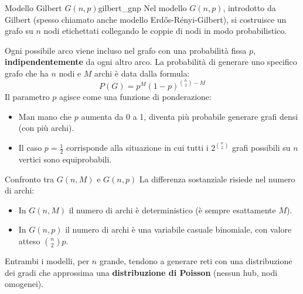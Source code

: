 \begin{definizione}{Modello Gilbert $G(n, p)$}{gilbert_gnp}
    Nel modello \textbf{$G(n, p)$}, introdotto da Gilbert (spesso chiamato
    anche modello Erd\H{o}s-Rényi-Gilbert), si costruisce un grafo su $n$ nodi
    etichettati collegando le coppie di nodi in modo probabilistico.
    
    Ogni possibile arco viene incluso nel grafo con una probabilità fissa $p$,
    \textbf{indipendentemente} da ogni altro arco.
    La probabilità di generare uno specifico grafo che ha $n$ nodi e $M$
    archi è data dalla formula:
    \[
        P(G) = p^M (1-p)^{\binom{n}{2} - M}
    \]
    Il parametro $p$ agisce come una funzione di ponderazione:
    \begin{itemize}
        \item Man mano che $p$ aumenta da 0 a 1, diventa più probabile
        generare grafi densi (con più archi).
        \item Il caso $p = \frac{1}{2}$ corrisponde alla situazione in cui
        tutti i $2^{\binom{n}{2}}$ grafi possibili su $n$ vertici sono
        equiprobabili.
    \end{itemize}
\end{definizione}

\begin{nota}{Confronto tra $G(n, M)$ e $G(n, p)$}{}
    La differenza sostanziale risiede nel numero di archi:
    \begin{itemize}
        \item In $G(n, M)$ il numero di archi è deterministico
        (è sempre esattamente $M$).
        \item In $G(n, p)$ il numero di archi è una variabile casuale
        binomiale, con valore atteso $\binom{n}{2}p$.
    \end{itemize}
    Entrambi i modelli, per $n$ grande, tendono a generare reti con una
    distribuzione dei gradi che approssima una
    \textbf{distribuzione di Poisson} (nessun hub, nodi omogenei).
\end{nota}


